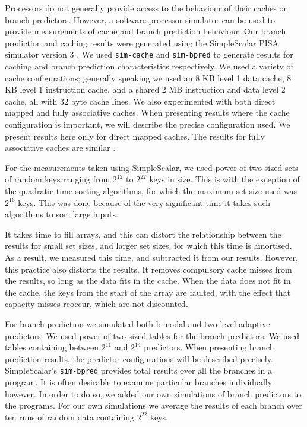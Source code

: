 \documentclass[acmtocl]{acmtrans2m}
\begin{document}
Processors do not generally provide access to the behaviour of their caches or branch predictors. However, a software processor simulator can be used to 
provide measurements 
of cache and branch prediction behaviour.
Our branch prediction and caching results were generated using the SimpleScalar PISA simulator version 3 \cite{SimpleScalarTutorialv4}. 
We used \texttt{sim-cache} and 
\texttt{sim-bpred} to generate results for caching and branch prediction characteristics respectively.
We used a variety of cache configurations; generally speaking we used an 8 KB level 1 data cache, 8 KB level 1 instruction cache,
and a shared 2 MB instruction and data level 2 cache, all with 32 byte cache lines. 
We also experimented with both direct mapped and fully associative caches. When presenting results
where the cache configuration is important, we will describe the precise configuration used. We present
results here only for direct mapped caches. The results for fully associative caches are similar \cite{BiggarGregg05}.

For the measurements taken using SimpleScalar, we used power of two sized sets of random keys ranging from $2^{12}$ to $2^{22}$ keys in size.
This is with the exception of the quadratic time sorting algorithms, for which the maximum set size used was $2^{16}$ keys. This was done
because of the very significant time it takes such algorithms to sort large inputs.


It takes time to fill arrays, and this can distort the relationship between the results for small set sizes, and larger set sizes, 
for which this time is amortised. As a result, we measured this time, and subtracted it from our results.
However, this practice also distorts the results. It removes compulsory cache misses from the results, so long as the data fits in the cache. 
When the data does not fit in the cache, the keys from the start of the array are faulted, with the effect that capacity misses reoccur, 
which are not discounted. 

For branch prediction we simulated both bimodal and two-level adaptive predictors. 
We used power of two sized tables for the branch predictors. 
We used tables containing between $2^{11}$ and $2^{14}$ predictors.
When
presenting branch prediction results, the predictor configurations will be described precisely.
SimpleScalar's \texttt{sim-bpred} provides total results over
all the branches in a program. It is often desirable to examine particular branches individually however.
In order to do so, we added our own simulations of branch predictors to the programs. For our 
own simulations we average the results of each branch over ten runs of random data containing $2^{22}$ keys.
\end{document}

